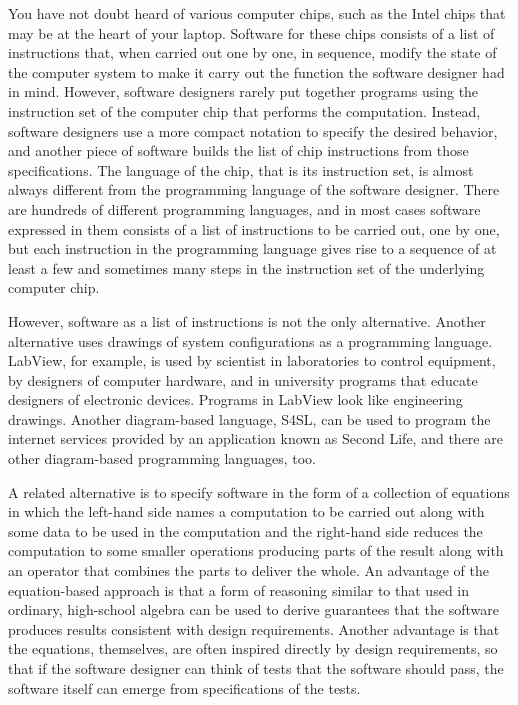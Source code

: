You have not doubt heard of various computer chips,
such as the Intel chips that may be at the heart of your laptop.
Software for these chips consists of a list of
instructions that, when carried out one by one, in sequence,
modify the state of the computer system to make it carry out
the function the software designer had in mind.
However, software designers rarely put together programs using
the instruction set of the computer chip that performs the computation.
Instead, software designers use a more compact notation to
specify the desired behavior, and another piece of software
builds the list of chip instructions from those specifications.
The language of the chip, that is its instruction set,
is almost always different from the programming language
of the software designer.
There are hundreds of different programming languages,
and in most cases software expressed in them consists
of a list of instructions to be carried out, one by one,
but each instruction in the programming language gives
rise to a sequence of at least a few and sometimes many
steps in the instruction set of the underlying computer chip.

However, software as a list of instructions is
not the only alternative.
Another alternative uses drawings of
system configurations as a programming language.
LabView, for example,
is used by scientist in laboratories to control equipment,
by designers of computer hardware,
and in university programs that educate designers of
electronic devices. Programs in LabView look like engineering drawings.
Another diagram-based language,
S4SL, can be used to program the internet services provided
by an application known as Second Life, and there
are other diagram-based programming languages, too.

A related alternative is to specify software in the form of
a collection of equations in which
the left-hand side names a computation to be carried out
along with some data to be used in the computation
and the right-hand side reduces the computation to
some smaller operations producing parts of the result
along with an operator that combines the parts to deliver the whole.
An advantage of the equation-based approach
is that a form of reasoning similar to that used
in ordinary, high-school algebra can be used to derive
guarantees that the software produces results consistent
with design requirements.
Another advantage is that the equations, themselves,
are often inspired directly by design requirements,
so that if the software designer can think of tests
that the software should pass, the software itself
can emerge from specifications of the tests.

